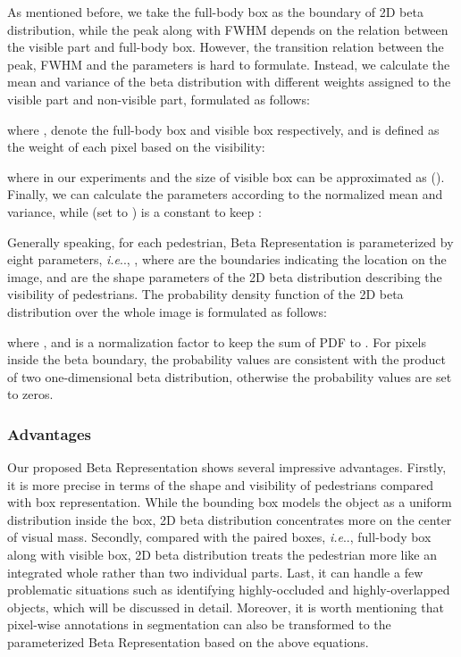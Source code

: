 \documentclass{article}
\makeatletter
\DeclareRobustCommand\onedot{\futurelet\@let@token\@onedot}
\def\@onedot{\ifx\@let@token.\else.\null\fi\xspace}
\def\ie{\emph{i.e}\onedot} \def\Ie{\emph{I.e}\onedot}
\makeatother
\begin{document}
As mentioned before, we take the full-body box as the boundary of 2D beta distribution, while the peak along with FWHM depends on the relation between the visible part and full-body box. 
However, the transition relation between the peak, FWHM and the parameters  is hard to formulate.
Instead, we calculate the mean and variance of the beta distribution with different weights assigned to the visible part and non-visible part, formulated as follows:

where ,  denote the full-body box and visible box respectively, and  is defined as the weight of each pixel based on the visibility:

where  in our experiments and the size of visible box can be approximated as  ().
Finally, we can calculate the parameters  according to the normalized mean and variance, while  (set to ) is a constant to keep :


Generally speaking, for each pedestrian, Beta Representation is parameterized by eight parameters, \ie, , where are the boundaries indicating the location on the image, and  are the shape parameters of the 2D beta distribution describing the visibility of pedestrians.
The probability density function of the 2D beta distribution over the whole image is formulated as follows:

where , and  is a normalization factor to keep the sum of PDF to . 
For pixels inside the beta boundary, the probability values are consistent with the product of two one-dimensional beta distribution, otherwise the probability values are set to zeros.

\subsubsection{Advantages}
Our proposed Beta Representation shows several impressive advantages. 
Firstly, it is more precise in terms of the shape and visibility of pedestrians compared with box representation.
While the bounding box models the object as a uniform distribution inside the box, 2D beta distribution concentrates more on the center of visual mass.
Secondly, compared with the paired boxes, \ie, full-body box along with visible box, 2D beta distribution treats the pedestrian more like an integrated whole rather than two individual parts.
Last, it can handle a few problematic situations such as identifying highly-occluded and highly-overlapped objects, which will be discussed in detail. 
Moreover, it is worth mentioning that pixel-wise annotations in segmentation can also be transformed to the parameterized Beta Representation based on the above equations.
\end{document}
